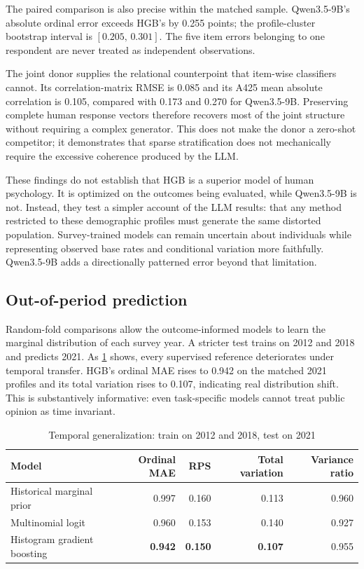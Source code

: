 \documentclass[11pt]{article}
\begin{document}
The paired comparison is also precise within the matched sample. Qwen3.5-9B's absolute ordinal error exceeds HGB's by 0.255 points; the profile-cluster bootstrap interval is $[0.205,\,0.301]$. The five item errors belonging to one respondent are never treated as independent observations.

The joint donor supplies the relational counterpoint that item-wise classifiers cannot. Its correlation-matrix RMSE is 0.085 and its A425 mean absolute correlation is 0.105, compared with 0.173 and 0.270 for Qwen3.5-9B. Preserving complete human response vectors therefore recovers most of the joint structure without requiring a complex generator. This does not make the donor a zero-shot competitor; it demonstrates that sparse stratification does not mechanically require the excessive coherence produced by the LLM.

These findings do not establish that HGB is a superior model of human psychology. It is optimized on the outcomes being evaluated, while Qwen3.5-9B is not. Instead, they test a simpler account of the LLM results: that any method restricted to these demographic profiles must generate the same distorted population. Survey-trained models can remain uncertain about individuals while representing observed base rates and conditional variation more faithfully. Qwen3.5-9B adds a directionally patterned error beyond that limitation.

\subsection{Out-of-period prediction}

Random-fold comparisons allow the outcome-informed models to learn the marginal distribution of each survey year. A stricter test trains on 2012 and 2018 and predicts 2021. As \cref{tab:temporal} shows, every supervised reference deteriorates under temporal transfer. HGB's ordinal MAE rises to 0.942 on the matched 2021 profiles and its total variation rises to 0.107, indicating real distribution shift. This is substantively informative: even task-specific models cannot treat public opinion as time invariant.

\begin{table}[H]
\centering
\caption{Temporal generalization: train on 2012 and 2018, test on 2021}
\label{tab:temporal}
\begin{tabular}{lrrrr}
\toprule
Model & Ordinal MAE & RPS & Total variation & Variance ratio \\
\midrule
Historical marginal prior & 0.997 & 0.160 & 0.113 & 0.960 \\
Multinomial logit & 0.960 & 0.153 & 0.140 & 0.927 \\
Histogram gradient boosting & \textbf{0.942} & \textbf{0.150} & \textbf{0.107} & 0.955 \\
\bottomrule
\end{tabular}
\end{table}
\end{document}
